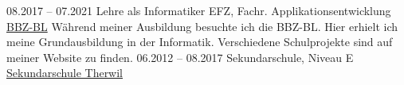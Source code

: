 \documentclass[9pt]{developercv} %
\begin{document}

\begin{entrylist}
	\entry
		{08.2017 -- 07.2021}
		{Lehre als Informatiker EFZ, Fachr. Applikationsentwicklung}
		{\href{https://www.bbzbl.ch/}{BBZ-BL}}
		{Während meiner Ausbildung besuchte ich die BBZ-BL. Hier erhielt ich meine Grundausbildung in der Informatik. Verschiedene Schulprojekte sind auf meiner Website zu finden.}
	\entry
		{06.2012 -- 08.2017}
		{Sekundarschule, Niveau E}
		{\href{https://www.sektherwil.ch/}{Sekundarschule Therwil}}
		{}
\end{entrylist}
\pagebreak


\end{document}
